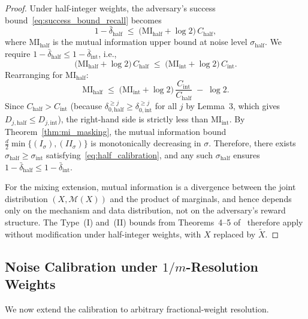 \documentclass[letterpaper]{article} %
\newcommand{\MI}{\mathrm{MI}}
\begin{document}
\begin{proof}
Under half-integer weights, the adversary's success bound~\eqref{eq:success_bound_recall} becomes
\[
1 - \bar{\delta}_{\mathrm{half}}
\;\le\;
\big(\MI_{\mathrm{half}} + \log 2\big)\, C_{\mathrm{half}},
\]
where $\MI_{\mathrm{half}}$ is the mutual information upper bound at noise level $\sigma_{\mathrm{half}}$. We require $1 - \bar{\delta}_{\mathrm{half}} \le 1 - \bar{\delta}_{\mathrm{int}}$, i.e.,
\[
\big(\MI_{\mathrm{half}} + \log 2\big)\, C_{\mathrm{half}}
\;\le\;
\big(\MI_{\mathrm{int}} + \log 2\big)\, C_{\mathrm{int}}.
\]
Rearranging for $\MI_{\mathrm{half}}$:
\[
\MI_{\mathrm{half}}
\;\le\;
\big(\MI_{\mathrm{int}} + \log 2\big)\,\frac{C_{\mathrm{int}}}{C_{\mathrm{half}}}
\;-\; \log 2.
\]
Since $C_{\mathrm{half}} > C_{\mathrm{int}}$ (because $\delta_{0,\mathrm{half}}^{\ge j} \ge \delta_{0,\mathrm{int}}^{\ge j}$ for all $j$ by Lemma~3, which gives $D_{j,\mathrm{half}} \le D_{j,\mathrm{int}}$), the right-hand side is strictly less than $\MI_{\mathrm{int}}$. By Theorem~\ref{thm:mi_masking}, the mutual information bound $\frac{d}{2}\min\{(I_\sigma),(II_\sigma)\}$ is monotonically decreasing in $\sigma$. Therefore, there exists $\sigma_{\mathrm{half}} \ge \sigma_{\mathrm{int}}$ satisfying~\eqref{eq:half_calibration}, and any such $\sigma_{\mathrm{half}}$ ensures $1 - \bar{\delta}_{\mathrm{half}} \le 1 - \bar{\delta}_{\mathrm{int}}$.

For the mixing extension, mutual information is a divergence between the joint distribution $(X, \mathcal{M}(X))$ and the product of marginals, and hence depends only on the mechanism and data distribution, not on the adversary's reward structure. The Type~(I) and~(II) bounds from Theorems~4--5 of~\cite{xiao2024formal} therefore apply without modification under half-integer weights, with $X$ replaced by $\tilde{X}$.
\end{proof}

\subsection{Noise Calibration under $1/m$-Resolution Weights}

We now extend the calibration to arbitrary fractional-weight resolution.
\end{document}
